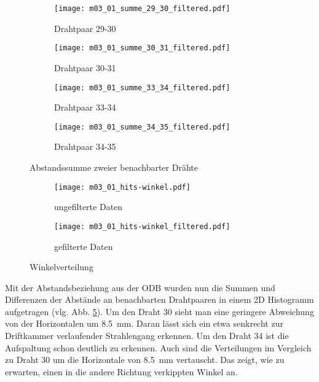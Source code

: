 \documentclass[11pt, ngerman, fleqn, DIV=15, headinclude, BCOR=2cm]{scrreprt}
\begin{document}
\begin{figure}
	\centering
	\begin{subfigure}{0.49 \linewidth}
		\texttt{[image: m03\_01\_summe\_29\_30\_filtered.pdf]}
		\caption{%
			Drahtpaar 29-30
		}
		\label{fig:m03_summe_29_30}
	\end{subfigure}
	\begin{subfigure}{0.49 \linewidth}
		\texttt{[image: m03\_01\_summe\_30\_31\_filtered.pdf]}
		\caption{%
			Drahtpaar 30-31
		}
		\label{fig:m03_summe_30_31}
	\end{subfigure}
	\begin{subfigure}{0.49 \linewidth}
		\texttt{[image: m03\_01\_summe\_33\_34\_filtered.pdf]}
		\caption{%
			Drahtpaar 33-34
		}
		\label{fig:m03_summe_33_34}
	\end{subfigure}
	\begin{subfigure}{0.49 \linewidth}
		\texttt{[image: m03\_01\_summe\_34\_35\_filtered.pdf]}
		\caption{%
			Drahtpaar 34-35
		}
		\label{fig:m03_summe_34_35}
	\end{subfigure}
\caption{%
		Abstandssumme zweier benachbarter Drähte
	}
	\label{fig:m03_ort_driftzeit}
\end{figure}

\begin{figure}
	\centering
	\begin{subfigure}{0.49 \linewidth}
		\texttt{[image: m03\_01\_hits-winkel.pdf]}
		\caption{%
			ungefilterte Daten
		}
		\label{fig:m03_hits-winkel}
	\end{subfigure}
	\begin{subfigure}{0.49 \linewidth}
		\texttt{[image: m03\_01\_hits-winkel\_filtered.pdf]}
		\caption{%
			gefilterte Daten
		}
		\label{fig:m03_hits-winkel_filtered}
	\end{subfigure}
	\caption{%
		Winkelverteilung
	}
	\label{fig:m03_winkelverteilung}
\end{figure}


Mit der Abstandsbeziehung aus der ODB wurden nun die Summen und Differenzen der
Abstände an benachbarten Drahtpaaren in einem 2D Histogramm aufgetragen (vlg.
Abb. \ref{fig:m03_ort_driftzeit}).
Um den Draht 30 sieht man eine geringere Abweichung von der Horizontalen um
\SI{8.5}{\milli\metre}. Daran lässt sich ein etwa senkrecht zur Driftkammer
verlaufender Strahlengang erkennen. Um den Draht 34 ist die Aufspaltung schon
deutlich zu erkennen. Auch sind die Verteilungen im Vergleich zu Draht 30 um
die Horizontale von \SI{8.5}{\milli\metre} vertauscht. Das zeigt, wie zu
erwarten, einen in die andere Richtung verkippten Winkel an.
\end{document}
